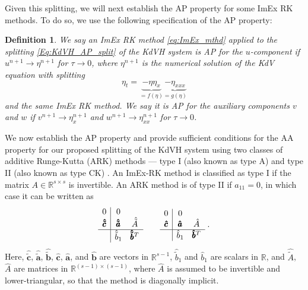 \documentclass{article}
\newcommand{\ukdv}{\eta}
\newcommand{\tIAim}{A}
\newcommand{\tIIcex}{\pmb{\hat{\tilde{c}}}}
\newcommand{\tIIAex}{\hat{\tilde{A}}}
\newcommand{\tIIaex}{\pmb{\hat{\tilde{a}}}}
\newcommand{\tIIbexf}{\hat{\tilde{b}}_1}
\newcommand{\tIIbex}{\pmb{\hat{\tilde{b}}}}
\newcommand{\tIIcim}{\pmb{\hat{c}}}
\newcommand{\tIIAim}{\hat{A}}
\newcommand{\tIIaim}{\pmb{\hat{a}}}
\newcommand{\tIIbim}{\pmb{\hat{b}}}
\newcommand{\tIIbimf}{\hat{b}_1}
\newtheorem{defn}{Definition}
\begin{document}
Given this splitting, we will next establish the AP property for some ImEx RK methods.
To do so, we use the following specification of the AP property:
\begin{defn}\label{Def:AP-for-components}
    We say an ImEx RK method \eqref{eq:ImEx_mthd} applied to the splitting
    \eqref{Eq:KdVH_AP_split} of the KdVH system is AP for the $u$-component if
    $u^{n+1} \to \ukdv^{n+1}$ for $\tau \to 0$, where $\ukdv^{n+1}$ is the
    numerical solution of the KdV equation with splitting
    \begin{equation}\label{Eq:KdV_AP_split}
        \ukdv_t
        =
        \underbrace{-\ukdv \ukdv_x}_{= f(\ukdv)}
        \underbrace{-\ukdv_{xxx}}_{= g(\ukdv)}
    \end{equation}
    and the same ImEx RK method. We say it is AP for the auxiliary components $v$ and $w$ if
    $v^{n+1} \to \ukdv_x^{n+1}$ and $w^{n+1} \to \ukdv_{xx}^{n+1}$ for $\tau \to 0$.
\end{defn}

We now establish the AP property and provide sufficient conditions for the AA property for our proposed splitting of the KdVH
system using two classes of additive Runge-Kutta (ARK) methods --- type I (also known as type A) and type II (also known as type CK) \cite{boscarino2024asymptotic}.
An ImEx-RK method is classified as type I if the matrix $ \tIAim \in \mathbb{R}^{s \times s} $ is invertible.
An ARK method is of type II if $a_{11}=0$, in which case it can be written as
\begin{equation}\label{Mthd:CK_SA_ARK}
\begin{array}{c|ccc}
    0 & 0 \\
    \tIIcex & \tIIaex & \tIIAex\\
    \hline
    & \tIIbexf & \tIIbex^T
\end{array}
\qquad
\begin{array}{c|ccc}
    0 & 0 \\
    \tIIcim & \tIIaim & \tIIAim \\
    \hline
    & \tIIbimf & \tIIbim^T
\end{array} \;.
\end{equation}
Here, $\tIIcex$, $\tIIaex$, $\tIIbex$, $\tIIcim$, $\tIIaim$, and $\tIIbim$ are vectors in $\mathbb{R}^{s-1}$, $\tIIbexf$ and $\tIIbimf$ are scalars in $\mathbb{R}$, and $\tIIAex$, $\tIIAim$ are matrices in $\mathbb{R}^{(s-1) \times (s-1)}$, where $\tIIAim$ is assumed to be invertible and lower-triangular, so that the method is diagonally implicit.
\end{document}
